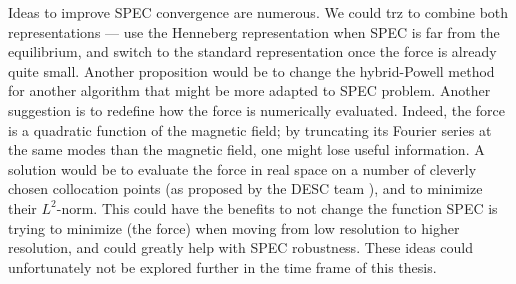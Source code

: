 \documentclass[my_thesis.tex]{subfiles}
\begin{document}
Ideas to improve SPEC convergence are numerous. We could trz to combine both representations --- use the Henneberg representation when SPEC is far from the equilibrium, and switch to the standard representation once the force is already quite small. Another proposition would be to change the hybrid-Powell method for another algorithm that might be more adapted to SPEC problem. Another suggestion is to redefine how the force is numerically evaluated. Indeed, the force is a quadratic function of the magnetic field; by truncating its Fourier series at the same modes than the magnetic field, one might lose useful information. A solution would be to evaluate the force in real space on a number of cleverly chosen collocation points (as proposed by the DESC team \citep{Dudt2020}), and to minimize their $L^2$-norm. This could have the benefits to not change the function SPEC is trying to minimize (the force) when moving from low resolution to higher resolution, and could greatly help with SPEC robustness. These ideas could unfortunately not be explored further in the time frame of this thesis.


\end{document}
